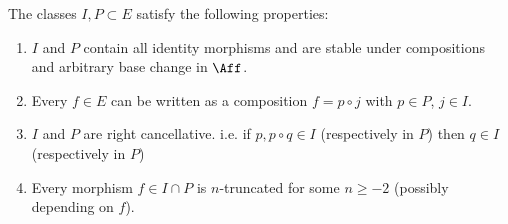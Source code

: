 \begin{lemma}\label{suitable decomposition I,P}
The classes $I,P \subset E $ satisfy the following properties: 
\begin{enumerate}
    \item $I$ and $P$ contain all identity morphisms and are stable under compositions and arbitrary base change in $\Aff$.
    \item Every $f\in E$ can be written as a composition $f= p \circ j$ with $p\in P$, $j\in I$.
    \item  $I$ and $P$ are right cancellative. i.e. if $p, p\circ q \in I$ (respectively in $P$) then $q \in I$ (respectively in $P$)
    \item Every morphism $f \in I\cap P$ is $n$-truncated for some $n \geq -2$ (possibly depending on $f$).
\end{enumerate}
\end{lemma}
